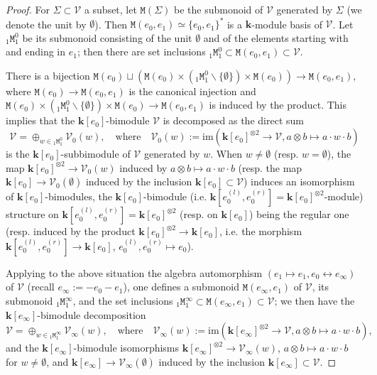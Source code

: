 \documentclass[10pt,a4paper]{amsart}
\begin{document}
\begin{proof}
For $\Sigma\subset\mathcal V$ a subset, let ${\mathtt M}(\Sigma)$ be the submonoid of $\mathcal V$ generated by $\Sigma$ 
(we denote the unit by $\emptyset$). Then ${\mathtt M}(e_0,e_1)\simeq\{e_0,e_1\}^*$ is a $\mathbf k$-module basis of $\mathcal V$. 
Let ${}_{1}{\mathtt M}^0_{1}$ be its submonoid consisting 
of the unit $\emptyset$ and of the elements starting with and ending in $e_1$; then there are set inclusions 
 ${}_{1}{\mathtt M}^0_{1}\subset{\mathtt M}(e_0,e_1)\subset\mathcal V$. 

There is a bijection ${\mathtt M}(e_0)\sqcup({\mathtt M}(e_0)\times({}_{1}{\mathtt M}^0_{1}\smallsetminus\{\emptyset\})
\times{\mathtt M}(e_0))\to {\mathtt M}(e_0,e_1)$, where ${\mathtt M}(e_0)\to {\mathtt M}(e_0,e_1)$ is the canonical
injection and ${\mathtt M}(e_0)\times({}_{1}{\mathtt M}^0_{1}\smallsetminus\{\emptyset\})
\times{\mathtt M}(e_0)\to {\mathtt M}(e_0,e_1)$ is induced by the product. This implies that  
the $\mathbf k[e_0]$-bimodule $\mathcal{V}$ is decomposed as the direct sum
$$
\mathcal V=\oplus_{w\in{} {}_{1}{\mathtt M}^0_{1}} \mathcal V_0(w),\quad \mathrm{where}\quad 
\mathcal V_0(w):=\mathrm{im}(
\textbf{k}%
[e_0]^{\otimes 2}\to \mathcal V,a\otimes b\mapsto a\cdot w\cdot b)
$$
is the $\mathbf k[e_0]$-subbimodule of $\mathcal V$ generated by $w$.  
When $w\neq\emptyset$ (resp. $w=\emptyset$), the map $\mathbf k[e_0]^{\otimes 2}\to \mathcal{V}_0(w)$ induced by 
$a\otimes b\mapsto a\cdot w\cdot b$ (resp. the map $\mathbf k[e_0]\to \mathcal V_0(\emptyset)$ induced by the inclusion 
$\mathbf k[e_0]\subset\mathcal V$) induces an isomorphism of $\mathbf k[e_0]$-bimodules, the 
$\mathbf k[e_0]$-bimodule (i.e. $\mathbf k[e_0^{(l)},e_0^{(r)}]=\mathbf k[e_0]^{\otimes 2}$-module) structure on 
$\mathbf k[e_0^{(l)},e_0^{(r)}]=\mathbf k[e_0]^{\otimes 2}$ (resp. on $\mathbf k[e_0]$) being the regular one
(resp. induced by the product $\mathbf k[e_0]^{\otimes 2}\to\mathbf k[e_0]$, i.e. the morphism 
$\mathbf k[e_0^{(l)},e_0^{(r)}]\to \mathbf k[e_0]$, $e_0^{(l)},e_0^{(r)}\mapsto e_0$). 

Applying to the above situation the algebra automorphism $(e_1\mapsto e_1,e_0\leftrightarrow e_\infty)$ of $\mathcal V$
(recall $e_\infty:=-e_0-e_1$), one defines a submonoid ${\mathtt M}(e_\infty,e_1)$ of $\mathcal V$,
its submonoid ${}_{1}{\mathtt M}^\infty_{1}$, and the set inclusions ${}_{1}{\mathtt M}_{1}^\infty\subset{\mathtt M}(e_\infty,e_1)
\subset \mathcal{V}$; we then have the $\mathbf k[e_\infty]$-bimodule decomposition
$$
\mathcal V=\oplus_{w\in{} {}_{1}{\mathtt M}^\infty_{1}} \mathcal{V}_\infty(w),\quad \mathrm{where}\quad 
\mathcal{V}_\infty(w):=\mathrm{im}(
\textbf{k}%
[e_\infty]^{\otimes 2}\to \mathcal{V},a\otimes b\mapsto a\cdot w\cdot b), 
$$
and the $\mathbf k[e_\infty]$-bimodule isomorphisms $\mathbf k[e_\infty]^{\otimes2}\to\mathcal V_\infty(w)$, $a\otimes b\mapsto 
a\cdot w\cdot b$ for $w\neq\emptyset$, and $\mathbf k[e_\infty]\to\mathcal V_\infty(\emptyset)$ induced by the inclusion 
$\mathbf k[e_\infty]\subset\mathcal V$. 


\end{proof}
\end{document}
